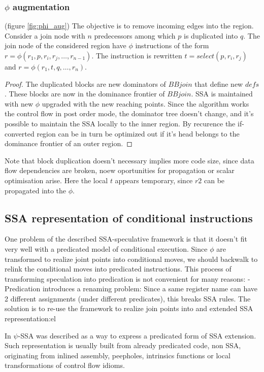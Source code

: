 \subsubsection{$\phi$ augmentation} (figure \ref{fig:phi_aug})
The objective is to remove incoming edges into the region. 
Consider a join node with $n$ predecessors among which $p$ is duplicated into $q$.  The join node of the considered region have $\phi$ instructions of the form $r=\phi(r_1,p,r_i,r_j,\dots,r_{n-1})$. The instruction is rewritten $t=select(p,r_i,r_j)$ and \mbox{$r=\phi(r_1,t,q,\dots,r_n)$}. 
\begin{proof}The duplicated blocks are new dominators of $BBjoin$ that define new $defs$. These blocks are now in the dominance frontier of $BBjoin$. SSA is maintained with new $\phi$ upgraded with the new reaching points.
Since the algorithm works the control flow in post order mode, the dominator tree doesn't change, and it's possible to maintain the SSA locally to the inner region. By recurence the if-converted region can be in turn be optimized out if it's head belongs to the dominance frontier of an outer region.
\end{proof}
Note that block duplication doesn't necessary implies more code size, since data flow dependencies are broken, noew oportunities for propagation or scalar optimisation arise. Here the local $t$ appears temporary, since $r2$ can be propagated into the $\phi$.

\subsection{SSA representation of conditional instructions}

One problem of the described SSA-speculative framework is that it doesn't fit very well with a predicated model of conditional execution. Since $\phi$ are transformed to realize joint points into conditional moves, we should backwalk to relink the conditional moves into predicated instructions. This process of transforming speculation into predication is not convenient for many reasons:
- Predication introduces a renaming problem: Since a same register name can have 2 different assignments (under different predicates), this breaks SSA rules. The solution is to re-use the framework to realize join points into and extended SSA representation:el

In \cite{Stoutchinin:2001:ESS:563998.564022} $\psi$-SSA was described as a way to express a predicated form of SSA extension. Such representation is usually built from already predicated code, non SSA, originating from inlined assembly, peepholes, intrinsics functions or local transformations of control flow idioms. 

